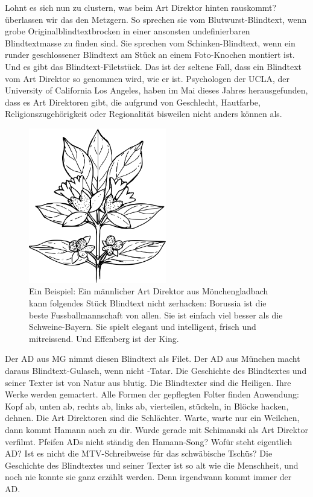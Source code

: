 \documentclass{scrartcl}
\begin{document}
  Lohnt es sich nun zu clustern, was beim Art Direktor hinten rauskommt? überlassen wir das den Metzgern. So sprechen sie vom Blutwurst-Blindtext, wenn grobe Originalblindtextbrocken in einer ansonsten undefinierbaren Blindtextmasse zu finden sind. Sie sprechen vom Schinken-Blindtext, wenn ein runder geschlossener Blindtext am Stück an einem Foto-Knochen montiert ist. Und es gibt das Blindtext-Filetstück. Das ist der seltene Fall, dass ein Blindtext vom Art Direktor so genommen wird, wie er ist. Psychologen der UCLA, der University of California Los Angeles, haben im Mai dieses Jahres herausgefunden, dass es Art Direktoren gibt, die aufgrund von Geschlecht, Hautfarbe, Religionszugehörigkeit oder Regionalität bisweilen nicht anders können als.

  \begin{figure}
    \centering
    \includegraphics[width=6cm]{flower}
    \caption{Ein Beispiel: Ein männlicher Art Direktor aus Mönchengladbach kann folgendes Stück Blindtext nicht zerhacken: Borussia ist die beste Fussballmannschaft von allen. Sie ist einfach viel besser als die Schweine-Bayern. Sie spielt elegant und intelligent, frisch und mitreissend. Und Effenberg ist der King.}
    \label{fig:flower}
  \end{figure}

  Der AD aus MG nimmt diesen Blindtext als Filet. Der AD aus München macht daraus Blindtext-Gulasch, wenn nicht -Tatar. Die Geschichte des Blindtextes und seiner Texter ist von Natur aus blutig. Die Blindtexter sind die Heiligen. Ihre Werke werden gemartert. Alle Formen der gepflegten Folter finden Anwendung: Kopf ab, unten ab, rechts ab, links ab, vierteilen, stückeln, in Blöcke hacken, dehnen. Die Art Direktoren sind die Schlächter. Warte, warte nur ein Weilchen, dann kommt Hamann auch zu dir. Wurde gerade mit Schimanski als Art Direktor verfilmt. Pfeifen ADs nicht ständig den Hamann-Song? Wofür steht eigentlich AD? Ist es nicht die MTV-Schreibweise für das schwäbische Tschüs? Die Geschichte des Blindtextes und seiner Texter ist so alt wie die Menschheit, und noch nie konnte sie ganz erzählt werden. Denn irgendwann kommt immer der AD.
\end{document}
